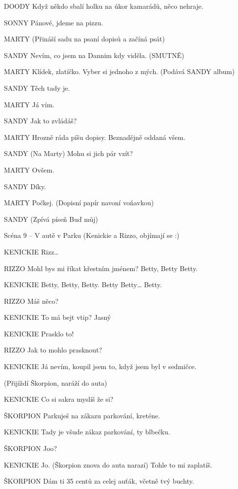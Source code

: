 DOODY        Když někdo sbalí holku na úkor kamarádů, něco nehraje. 

SONNY        Pánové, jdeme na pizzu.

        

MARTY        (Přináší sadu na psaní dopisů a začíná psát)

SANDY        Nevím, co jsem na Dannim kdy viděla. (SMUTNĚ)

MARTY        Klídek, zlatíčko. Vyber si jednoho z mých. (Podává SANDY album)

SANDY        Těch tady je. 

MARTY        Já vím.

SANDY        Jak to zvládáš?

MARTY        Hrozně ráda píšu dopisy. Beznadějně oddaná všem.

SANDY        (Na Marty) Mohu si jich pár vzít?

MARTY        Ovšem.

SANDY        Díky.

MARTY        Počkej. (Dopisní papír navoní voňavkou)

SANDY        (Zpívá píseň Buď můj)

Scéna 9 – V autě v Parku (Kenickie a Rizzo, objímají se :)

KENICKIE        Rizz…

RIZZO        Mohl bys mi říkat křestním jménem? Betty, Betty Betty.

KENICKIE        Betty, Betty, Betty. Betty Betty… Betty.

RIZZO        Máš něco?

KENICKIE        To má bejt vtip? Jasný

KENICKIE        Prasklo to!

RIZZO        Jak to mohlo prasknout?

KENICKIE        Já nevím, koupil jsem to, když jsem byl v sedmičce.

(Přijíždí Škorpion, naráží do auta)

KENICKIE        Co si sakra myslíš že si?

ŠKORPION        Parkuješ na zákazu parkování, kreténe.

KENICKIE        Tady je všude zákaz parkování, ty blbečku.

ŠKORPION        Joo?

KENICKIE        Jo. (Škorpion znova do auta narazí) Tohle to mi zaplatíš.

ŠKORPION        Dám ti 35 centů za celej auťák, včetně tvý buchty.

